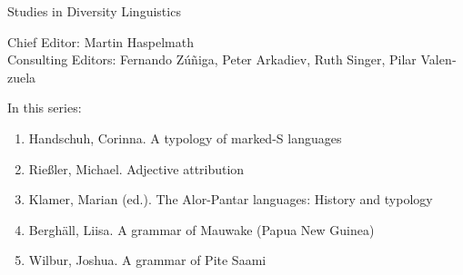 {\large Studies in Diversity Linguistics}

\bigskip

Chief Editor: Martin Haspelmath \\
Consulting Editors: Fernando Zúñiga, Peter Arkadiev, Ruth Singer, Pilar Valen­zuela

\bigskip

In this series:

\begin{enumerate}
\item Handschuh, Corinna. A typology of marked-S languages
\item Rießler, Michael. Adjective attribution
\item Klamer, Marian (ed.). The Alor-Pantar languages: History and typology
\item Berghäll, Liisa. A grammar of Mauwake (Papua New Guinea)
\item Wilbur, Joshua. A grammar of Pite Saami
\end{enumerate}



